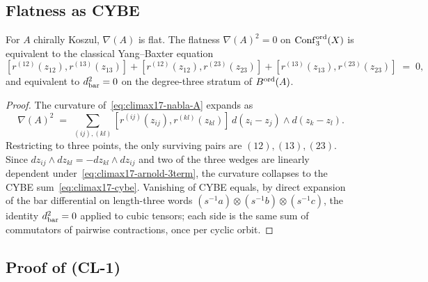 \subsection{Flatness as CYBE}

\begin{proposition}[Arnold flatness $\Leftrightarrow$ CYBE $\Leftrightarrow$ $\dbar^2=0$]
\label{prop:climax17-arnold-cybe}
\ClaimStatusProvedHere
For $A$ chirally Koszul, $\nabla(A)$ is flat. The flatness
$\nabla(A)^2=0$ on $\operatorname{Conf}_3^{\mathrm{ord}}(X)$ is equivalent to the
classical Yang--Baxter equation
\begin{equation}
\label{eq:climax17-cybe}
  [r^{(12)}(z_{12}),r^{(13)}(z_{13})]
  +[r^{(12)}(z_{12}),r^{(23)}(z_{23})]
  +[r^{(13)}(z_{13}),r^{(23)}(z_{23})]
  \;=\;0,
\end{equation}
and equivalent to $\dbar^2=0$ on the degree-three stratum of $B^{\mathrm{ord}}(A)$.
\end{proposition}

\begin{proof}
The curvature of~\eqref{eq:climax17-nabla-A} expands as
\[
  \nabla(A)^2
  \;=\;\sum_{(ij),(kl)}[r^{(ij)}(z_{ij}),r^{(kl)}(z_{kl})]\,
       d(z_i-z_j)\wedge d(z_k-z_l).
\]
Restricting to three points, the only surviving pairs are
$(12),(13),(23)$. Since
$d z_{ij}\wedge d z_{kl}=-dz_{kl}\wedge dz_{ij}$ and two of the three
wedges are linearly dependent under~\eqref{eq:climax17-arnold-3term},
the curvature collapses to the CYBE sum~\eqref{eq:climax17-cybe}.
Vanishing of CYBE equals, by direct expansion of the bar differential on
length-three words $(s^{-1}a)\otimes(s^{-1}b)\otimes(s^{-1}c)$,
the identity $\dbar^2=0$ applied to cubic tensors; each side is the
same sum of commutators of pairwise contractions, once per cyclic
orbit.
\end{proof}

\subsection{Proof of (CL-1)}
\label{subsec:climax17-cl1-proof}

